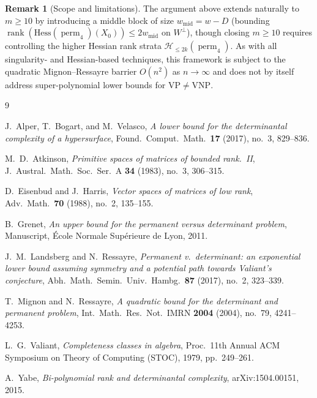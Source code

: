 \documentclass[11pt,a4paper]{article}
\theoremstyle{definition}
\newtheorem{remark}[theorem]{Remark}
\DeclareMathOperator{\perm}{perm}
\DeclareMathOperator{\rank}{rank}
\begin{document}
\begin{remark}[Scope and limitations]
The argument above extends naturally to $m \ge 10$ by introducing a middle block of size $w_{\mathrm{mid}} = w - D$ (bounding $\rank(\mathrm{Hess}(\perm_4)(X_0)) \le 2 w_{\mathrm{mid}}$ on $W^\perp$), though closing $m \ge 10$ requires controlling the higher Hessian rank strata $\mathcal{H}_{\le 2k}(\perm_4)$. As with all singularity- and Hessian-based techniques, this framework is subject to the quadratic Mignon--Ressayre barrier $O(n^2)$ as $n \to \infty$ and does not by itself address super-polynomial lower bounds for $\mathrm{VP} \neq \mathrm{VNP}$.
\end{remark}

\begin{thebibliography}{9}

J.~Alper, T.~Bogart, and M.~Velasco,
\emph{A lower bound for the determinantal complexity of a hypersurface},
Found.\ Comput.\ Math.\ \textbf{17} (2017), no.~3, 829--836.

M.~D.~Atkinson,
\emph{Primitive spaces of matrices of bounded rank.~II},
J.\ Austral.\ Math.\ Soc.\ Ser.~A \textbf{34} (1983), no.~3, 306--315.

D.~Eisenbud and J.~Harris,
\emph{Vector spaces of matrices of low rank},
Adv.\ Math.\ \textbf{70} (1988), no.~2, 135--155.

B.~Grenet,
\emph{An upper bound for the permanent versus determinant problem},
Manuscript, \'Ecole Normale Sup\'erieure de Lyon, 2011.

J.~M.~Landsberg and N.~Ressayre,
\emph{Permanent v.\ determinant: an exponential lower bound assuming symmetry and a potential path towards Valiant's conjecture},
Abh.\ Math.\ Semin.\ Univ.\ Hambg.\ \textbf{87} (2017), no.~2, 323--339.

T.~Mignon and N.~Ressayre,
\emph{A quadratic bound for the determinant and permanent problem},
Int.\ Math.\ Res.\ Not.\ IMRN \textbf{2004} (2004), no.~79, 4241--4253.

L.~G.~Valiant,
\emph{Completeness classes in algebra},
Proc.\ 11th Annual ACM Symposium on Theory of Computing (STOC), 1979, pp.~249--261.

A.~Yabe,
\emph{Bi-polynomial rank and determinantal complexity},
arXiv:1504.00151, 2015.

\end{thebibliography}
\end{document}
